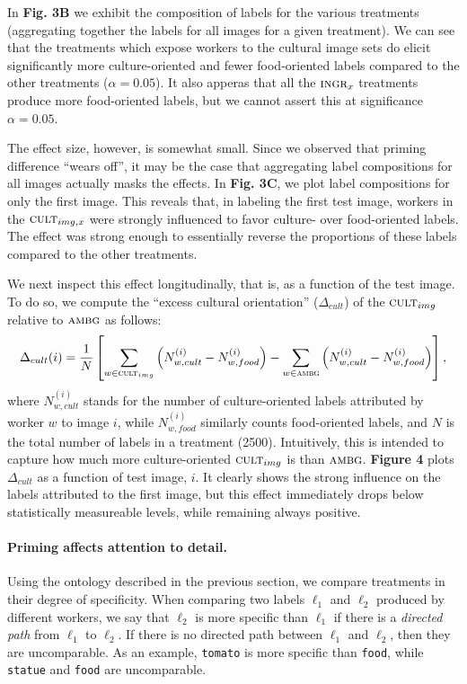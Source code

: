\documentclass[a4paper]{report}
\begin{document}
In \textbf{Fig. 3B} we exhibit the composition of labels for the various 
treatments (aggregating together the labels for all images for a given 
treatment).  We can see that the treatments which expose workers to the
cultural image sets do elicit significantly more culture-oriented and fewer
food-oriented labels compared to the other treatments ($\alpha=0.05$).  It 
also apperas that all the $\textsc{ingr}_x$ treatments produce more 
food-oriented labels, but we cannot assert this at significance 
$\alpha = 0.05$. 

The effect size, however, is somewhat small.  Since we observed that priming 
difference ``wears off'', it may be the case 
that aggregating label compositions for all images actually masks the effects. 
In \textbf{Fig. 3C}, we plot label compositions for only the first
image.  This reveals that, in labeling the first test image, workers in the
$\textsc{cult}_{img,x}$ were strongly influenced to favor culture- over 
food-oriented labels.  The effect was strong enough to essentially reverse 
the proportions of these labels compared to the other treatments.

We next inspect this effect longitudinally, that is, as a function of 
the test image.  To do so, we compute the ``excess cultural orientation'' 
($\Delta_{cult}$) of
the $\textsc{cult}_{img}$ relative to $\textsc{ambg}$ as follows: 
\begin{align}
	\Delta_{cult}(i) = \frac{1}{N}\left[ \sum_{w\in\textsc{cult}_{img}} \left(N_{w,cult}^{(i)} - N_{w,food}^{(i)}\right)
	- \sum_{w\in\textsc{ambg}} \left(N_{w,cult}^{(i)} - N_{w,food}^{(i)}\right)\right],
\end{align}
where $N_{w,cult}^{(i)}$ stands for the number of culture-oriented labels 
attributed by worker $w$ to image $i$, while $N_{w,food}^{(i)}$ similarly 
counts food-oriented labels, and $N$ is the total number of labels in a 
treatment (2500).  
Intuitively, this is intended to capture how much 
more culture-oriented $\textsc{cult}_{img}$ is than $\textsc{ambg}$.  
\textbf{Figure 4} plots $\Delta_{cult}$ as a function of test image, $i$. It
clearly shows the strong influence on the labels attributed to the first image,
but this effect immediately drops below statistically measureable levels, while
remaining always positive.

\paragraph{Priming affects attention to detail.} Using the ontology described
in the previous section, we compare treatments in their degree of specificity.
When comparing two labels $\ell_1$ and $\ell_2$ produced by different workers,
we say that $\ell_2$ is more specific than $\ell_1$ if there is a 
\textit{directed path} from $\ell_1$ to $\ell_2$.  If there is no directed path
between $\ell_1$ and $\ell_2$, then they are uncomparable.  As an example,
\texttt{tomato} is more specific than \texttt{food}, while \texttt{statue}
and \texttt{food} are uncomparable.
\end{document}
